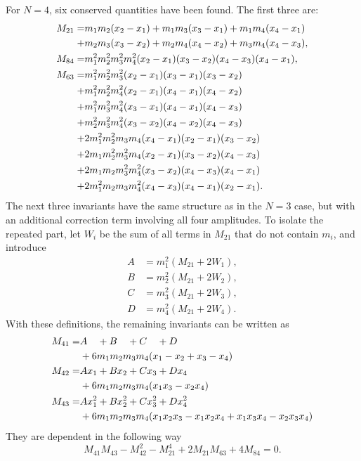 \documentclass[english,master]{liumaiex}
\theoremstyle{thesisplain}
\theoremstyle{thesisdefinition}
\numberwithin{equation}{section}
\begin{document}
For $N = 4$, six conserved quantities have been found. The first three are:
\begin{align}
	M_{21} =
		 &m_1 m_2 (x_2 - x_1) + m_1 m_3 (x_3 - x_1) + m_1 m_4 (x_4 - x_1) \notag\\
		+&m_2 m_3 (x_3 - x_2) + m_2 m_4 (x_4 - x_2) + m_3 m_4 (x_4 - x_3),\\
	M_{84} =
		 &m_1^2m_2^2m_3^2m_4^2(x_2 - x_1)(x_3 - x_2)(x_4 - x_3)(x_4 - x_1),\\
	M_{63} =
		 &m_1^2m_2^2m_3^2(x_2 - x_1)(x_3 - x_1)(x_3 - x_2) \notag\\
		+&m_1^2m_2^2m_4^2(x_2 - x_1)(x_4 - x_1)(x_4 - x_2) \notag\\
		+&m_1^2m_3^2m_4^2(x_3 - x_1)(x_4 - x_1)(x_4 - x_3) \notag\\
		+&m_2^2m_3^2m_4^2(x_3 - x_2)(x_4 - x_2)(x_4 - x_3) \notag\\
		+&2m_1^2m_2^2m_3m_4(x_4 - x_1)(x_2 - x_1)(x_3 - x_2) \notag\\
		+&2m_1m_2^2m_3^2m_4(x_2 - x_1)(x_3 - x_2)(x_4 - x_3) \notag\\
		+&2m_1m_2m_3^2m_4^2(x_3 - x_2)(x_4 - x_3)(x_4 - x_1) \notag\\
		+&2m_1^2m_2m_3m_4^2(x_4 - x_3)(x_4 - x_1)(x_2 - x_1).
\end{align}
The next three invariants have the same structure as in the $N=3$ case, but with an additional correction term involving all four amplitudes. To isolate the repeated part, let $W_i$ be the sum of all terms in $M_{21}$ that do not contain $m_i$, and introduce
\begin{align}
	A &= m_1^2(M_{21} + 2W_1), \\
	B &= m_2^2(M_{21} + 2W_2), \\
	C &= m_3^2(M_{21} + 2W_3), \\
	D &= m_4^2(M_{21} + 2W_4).
\end{align}
With these definitions, the remaining invariants can be written as
\begin{align}
	M_{41} =& A\phantom{x_1} + B\phantom{x_2} + C\phantom{x_3} + D\phantom{x_4} \notag \\
	&+ 6m_1m_2m_3m_4 (x_1 - x_2 + x_3 - x_4) \\
	M_{42} =& Ax_1 + Bx_2 + Cx_3 + Dx_4 \notag \\
	&+ 6m_1m_2m_3m_4 (x_1x_3 - x_2x_4) \\
	M_{43} =& Ax_1^2 + Bx_2^2 + Cx_3^2 + Dx_4^2 \notag \\
	&+ 6m_1m_2m_3m_4 (x_1x_2x_3 - x_1x_2x_4 + x_1x_3x_4 - x_2x_3x_4)
\end{align}
%
They are dependent in the following way
\begin{equation}
	M_{41}M_{43} - M_{42}^2 - M_{21}^4 + 2M_{21}M_{63} + 4M_{84}=0.
\end{equation}
\end{document}
